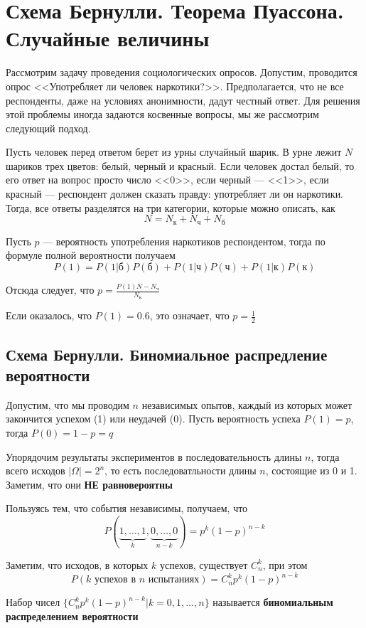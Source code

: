 \documentclass[a4paper, 10pt]{article}
\begin{document}
\newpage
\section{Схема Бернулли. Теорема Пуассона. Случайные величины}
Рассмотрим задачу проведения социологических опросов. Допустим, проводится опрос <<Употребляет ли человек наркотики?>>. Предполагается, что не все респонденты, даже на условиях анонимности, дадут честный ответ. Для решения этой проблемы иногда задаются косвенные вопросы, мы же рассмотрим следующий подход.

Пусть человек перед ответом берет из урны случайный шарик. В урне лежит $N$ шариков трех цветов: белый, черный и красный. Если человек достал белый, то его ответ на вопрос просто число <<0>>, если черный — <<1>>, если красный — респондент должен сказать правду: употребляет ли он наркотики. Тогда, все ответы разделятся на три категории, которые можно описать, как
$$N=N_\text{к}+N_{\text{ч}}+N_{\text{б}}$$

Пусть $p$ — вероятность употребления наркотиков респондентом, тогда по формуле полной вероятности получаем
$$P(1)=P(1|\text{б})P(\text{б})+P(1|\text{ч})P(\text{ч})+P(1|\text{к})P(\text{к})$$

Отсюда следует, что $p=\displaystyle\frac{P(1)N-N_{\text{ч}}}{N_{\text{к}}}$

\ex Если оказалось, что $P(1)=0.6$, это означает, что $p=\frac{1}{2}$

\subsection{Схема Бернулли. Биномиальное распредление вероятности}
Допустим, что мы проводим $n$ независимых опытов, каждый из которых может закончится успехом (1) или неудачей (0). Пусть вероятность успеха $P(1)=p$, тогда $P(0)=1-p=q$

Упорядочим результаты экспериментов в последовательность длины $n$, тогда всего исходов $|\Omega|=2^n$, то есть последоватльности длины $n$, состоящие из 0 и 1. Заметим, что они \textbf{НЕ равновероятны}

Пользуясь тем, что события независимы, получаем, что $$P(\underbrace{1,\ldots,1}_{k},\underbrace{0,\ldots,0}_{n-k})=p^k(1-p)^{n-k}$$

Заметим, что исходов, в которых $k$ успехов, существует $C_n^k$, при этом
$$P(\text{$k$ успехов в $n$ испытаниях})=C_n^k p^k(1-p)^{n-k}$$

 Набор чисел $\{C_n^k p^k(1-p)^{n-k}|k=0,1,\ldots,n\}$ называется \textbf{биномиальным распределением вероятности}
\end{document}
